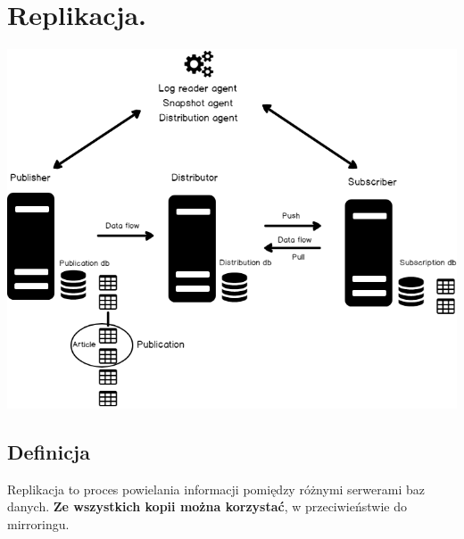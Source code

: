 \documentclass[a4paper]{article}
\begin{document}
    \section{Replikacja.}
    \begin{center}
        \includegraphics[width=\textwidth]{graphics/replication.png}
    \end{center}

    \subsection{Definicja}
    Replikacja to proces powielania informacji pomiędzy różnymi serwerami baz danych. \textbf{Ze wszystkich kopii można
    korzystać}, w przeciwieństwie do mirroringu.
\end{document}
